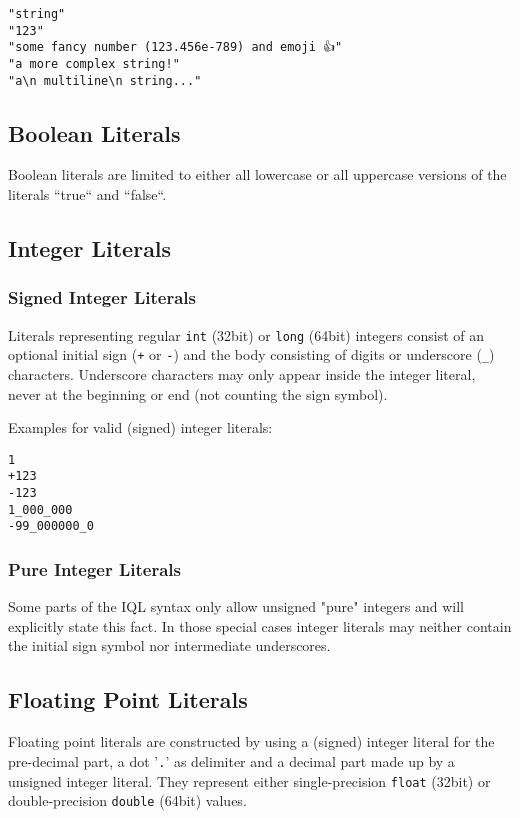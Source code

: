 \documentclass[11pt]{article}
\begin{document}
\begin{verbatim}
"string"
"123"
"some fancy number (123.456e-789) and emoji 👍"
"a more complex string!"
"a\n multiline\n string..."
\end{verbatim}

\subsection{Boolean Literals}
\label{sec:boolean-literals}

Boolean literals are limited to either all lowercase or all uppercase versions of the literals ``true`` and ``false``.

\subsection{Integer Literals}
\label{sec:integer-literals}

\subsubsection{Signed Integer Literals}
Literals representing regular \texttt{int} (32bit) or \texttt{long} (64bit) integers consist of an optional initial sign (\texttt{+} or \texttt{-}) and the body consisting of digits or underscore (\texttt{\_}) characters.
Underscore characters may only appear inside the integer literal, never at the beginning or end (not counting the sign symbol).

Examples for valid (signed) integer literals:

\begin{verbatim}
1
+123
-123
1_000_000
-99_000000_0
\end{verbatim}

\subsubsection{Pure Integer Literals}
Some parts of the IQL syntax only allow unsigned "pure" integers and will explicitly state this fact. In those special cases integer literals may neither contain the initial sign symbol nor intermediate underscores.

\subsection{Floating Point Literals}
\label{sec:floating-point-literals}

Floating point literals are constructed by using a (signed) integer literal for the pre-decimal part, a dot '\texttt{.}' as delimiter and a decimal part made up by a unsigned integer literal. They represent either single-precision \texttt{float} (32bit) or double-precision \texttt{double} (64bit) values.
\end{document}
